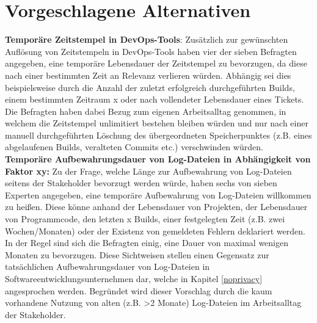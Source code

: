 \section{Vorgeschlagene Alternativen} \label{alternatives}
\textbf{Temporäre Zeitstempel in DevOps-Tools}: \newline
Zusätzlich zur gewünschten Auflösung von Zeitstempeln in DevOps-Tools haben vier der sieben Befragten angegeben, eine temporäre Lebensdauer der Zeitstempel zu bevorzugen, da diese nach einer bestimmten Zeit an Relevanz verlieren würden. Abhängig sei dies beispielsweise durch die Anzahl der zuletzt erfolgreich durchgeführten Builds, einem bestimmten Zeitraum x oder nach vollendeter Lebensdauer eines Tickets. 
Die Befragten haben dabei Bezug zum eigenen Arbeitsalltag genommen, in welchem die Zeitstempel unlimitiert bestehen bleiben würden und nur nach einer manuell durchgeführten Löschung des übergeordneten Speicherpunktes (z.B. eines abgelaufenen Builds, veralteten Commits etc.) verschwinden würden. \newline \newline
\textbf{Temporäre Aufbewahrungsdauer von Log-Dateien in Abhängigkeit von Faktor xy:}
Zu der Frage, welche Länge zur Aufbewahrung von Log-Dateien seitens der Stakeholder bevorzugt werden würde, haben sechs von sieben Experten angegeben, eine temporäre Aufbewahrung von Log-Dateien willkommen zu heißen. Diese könne anhand der Lebensdauer von Projekten, der Lebensdauer von Programmcode, den letzten x Builds, einer festgelegten Zeit (z.B. zwei Wochen/Monaten)
oder der Existenz von gemeldeten Fehlern deklariert werden. In der Regel sind sich die Befragten einig, eine Dauer von maximal wenigen Monaten zu bevorzugen. Diese Sichtweisen stellen einen Gegensatz zur tatsächlichen Aufbewahrungsdauer von Log-Dateien in Softwareentwicklungsunternehmen dar, welche in Kapitel \ref{noprivacy} angesprochen werden. Begründet wird dieser Vorschlag
durch die kaum vorhandene Nutzung von alten (z.B. >2 Monate) Log-Dateien im Arbeitsalltag der Stakeholder.




